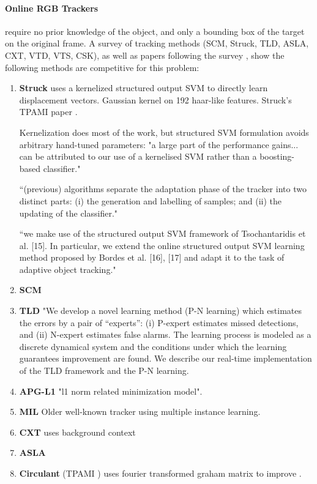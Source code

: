 \paragraph{Online RGB Trackers} require no prior knowledge of the object, and only a bounding box of the target on the original frame. 
A survey of tracking methods \cite{wu2013online} (SCM, Struck, TLD, ASLA, CXT, VTD, VTS, CSK), as well as papers following the survey \cite{supancic2013self}, show the following methods are competitive for this problem:
\begin{enumerate}
\item \textbf{Struck} \cite{hare2011struck}  uses a kernelized structured output SVM to directly learn displacement vectors. Gaussian kernel on 192 haar-like features. Struck's TPAMI paper \cite{hare2014struck}. 

Kernelization does most of the work, but structured SVM formulation avoids arbitrary hand-tuned parameters: "a large part of the performance gains... can be attributed to our use of a kernelised SVM rather than a boosting-based classifier."

``(previous) algorithms separate the adaptation phase of
the tracker into two distinct parts: (i) the generation and
labelling of samples; and (ii) the updating of the classifier."

``we make use of the structured output SVM
framework of Tsochantaridis et al. [15]. In particular, we
extend the online structured output SVM learning method
proposed by Bordes et al. [16], [17] and adapt it to the task
of adaptive object tracking."

\item \textbf{SCM} \cite{zhong2012robust} 
\item \textbf{TLD} \cite{kalal2012tracking} "We develop a novel learning method (P-N learning) which estimates the
errors by a pair of “experts”: (i) P-expert estimates missed detections, and (ii) N-expert estimates false alarms. The learning process is
modeled as a discrete dynamical system and the conditions under which the learning guarantees improvement are found. We describe
our real-time implementation of the TLD framework and the P-N learning.

\item \textbf{APG-L1} \cite{bao2012real} "l1 norm related minimization model".
\item \textbf{MIL} \cite{babenko2009visual} Older well-known tracker using multiple instance learning.
\item \textbf{CXT} \cite{dinh2011context} uses background context
\item \textbf{ASLA} \cite{jia2012visual} 
\item \textbf{Circulant} \cite{henriques2012exploiting} (TPAMI \cite{henriques2015tracking}) uses fourier transformed graham matrix to improve .


\end{enumerate}
